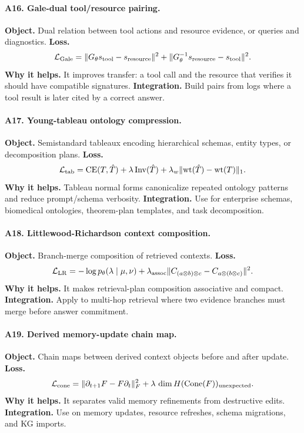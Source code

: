 \documentclass[11pt]{article}
\newcommand{\loss}{\mathcal{L}}
\numberwithin{equation}{section}
\begin{document}
\paragraph{A16. Gale-dual tool/resource pairing.}
\textbf{Object.} Dual relation between tool actions and resource evidence, or queries and diagnostics. \textbf{Loss.}
\begin{equation}
\loss_{\rm Gale}=\|G_\theta s_{\rm tool}-s_{\rm resource}\|^2+\|G_\theta^{-1}s_{\rm resource}-s_{\rm tool}\|^2.
\end{equation}
\textbf{Why it helps.} It improves transfer: a tool call and the resource that verifies it should have compatible signatures. \textbf{Integration.} Build pairs from logs where a tool result is later cited by a correct answer.

\paragraph{A17. Young-tableau ontology compression.}
\textbf{Object.} Semistandard tableaux encoding hierarchical schemas, entity types, or decomposition plans. \textbf{Loss.}
\begin{equation}
\loss_{\rm tab}=\operatorname{CE}(T,\hat T)+\lambda\operatorname{Inv}(\hat T)+\lambda_w\|\mathrm{wt}(\hat T)-\mathrm{wt}(T)\|_1.
\end{equation}
\textbf{Why it helps.} Tableau normal forms canonicalize repeated ontology patterns and reduce prompt/schema verbosity. \textbf{Integration.} Use for enterprise schemas, biomedical ontologies, theorem-plan templates, and task decomposition.

\paragraph{A18. Littlewood-Richardson context composition.}
\textbf{Object.} Branch-merge composition of retrieved contexts. \textbf{Loss.}
\begin{equation}
\loss_{\rm LR}= -\log p_\theta(\lambda\mid\mu,\nu)+\lambda_{\rm assoc}\|C_{(a\otimes b)\otimes c}-C_{a\otimes(b\otimes c)}\|^2.
\end{equation}
\textbf{Why it helps.} It makes retrieval-plan composition associative and compact. \textbf{Integration.} Apply to multi-hop retrieval where two evidence branches must merge before answer commitment.

\paragraph{A19. Derived memory-update chain map.}
\textbf{Object.} Chain maps between derived context objects before and after update. \textbf{Loss.}
\begin{equation}
\loss_{\rm cone}=\|\partial_{t+1}F-F\partial_t\|_F^2+\lambda\,\dim H(\operatorname{Cone}(F))_{\rm unexpected}.
\end{equation}
\textbf{Why it helps.} It separates valid memory refinements from destructive edits. \textbf{Integration.} Use on memory updates, resource refreshes, schema migrations, and KG imports.
\end{document}
